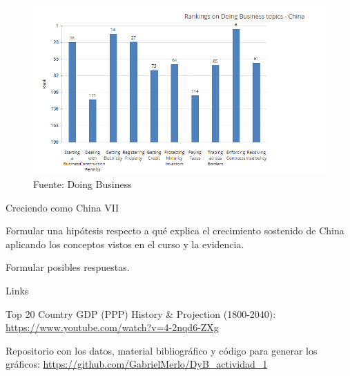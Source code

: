 \documentclass{beamer}
\let\tempone\itemize
\let\temptwo\enditemize
\renewenvironment{itemize}{\tempone\addtolength{\itemsep}{0.5\baselineskip}}{\temptwo}
\begin{document}
	\begin{frame}[plain]
		\begin{figure}
			\centering
			\includegraphics[width=\linewidth, keepaspectratio]{doing_business_rank_components} \\
			{\footnotesize{Fuente: Doing Business}}
		\end{figure}
	\end{frame}

	\begin{frame}{Creciendo como China VII}
		\begin{itemize}
			\item Formular una hipótesis respecto a qué explica el crecimiento sostenido de China aplicando los conceptos vistos en el curso y la evidencia.
			\item Formular posibles respuestas.
		\end{itemize}
	\end{frame}	

	\begin{frame}{Links}
		\begin{itemize}
			\item Top 20 Country GDP (PPP) History \& Projection (1800-2040):  \href{https://www.youtube.com/watch?v=4-2nqd6-ZXg}{https://www.youtube.com/watch?v=4-2nqd6-ZXg}
			\item Repositorio con los datos, material bibliográfico y código para generar los gráficos: \href{https://github.com/GabrielMerlo/DyB_actividad_1}{https://github.com/GabrielMerlo/DyB\_actividad\_1}
		\end{itemize}
	\end{frame}	
\end{document}
